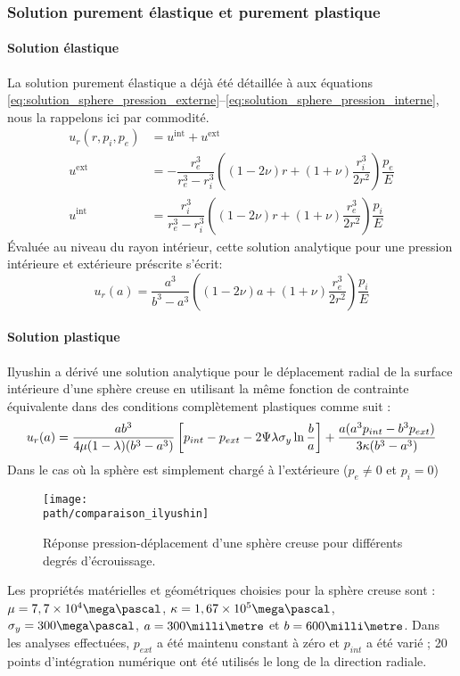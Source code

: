 \documentclass[10pt]{book}
\def\path{./fig}
\begin{document}
\subsubsection{Solution purement élastique et purement plastique}
\paragraph{Solution élastique}
La solution purement élastique a déjà été détaillée à aux équations \eqref{eq:solution_sphere_pression_externe}--\eqref{eq:solution_sphere_pression_interne}, nous la rappelons ici par commodité.
$$\begin{aligned}
u_{r}(r,p_{i}, p_{e})& = u^{\mathrm{int}}+u^{\mathrm{ext}}\\
u^{\mathrm{ext}}&=-\dfrac{r_{e}^{3}}{r_{e}^{3}-r_{i}^{3}}\left((1-2\nu)r+(1+\nu)\dfrac{r_{i}^{3}}{2r^{2}}\right)\dfrac{p_{e}}{E}\\
u^{\mathrm{int}}&=\dfrac{r_{i}^{3}}{r_{e}^{3}-r_{i}^{3}}\left((1-2\nu)r+(1+\nu)\dfrac{r_{e}^{3}}{2r^{2}}\right)\dfrac{p_{i}}{E}
\end{aligned}$$
Évaluée au niveau du rayon intérieur, cette solution analytique pour une pression intérieure et extérieure préscrite s'écrit:
$$u_{r}(a)=\dfrac{a^{3}}{b^{3}-a^{3}}\left((1-2\nu)a+(1+\nu)\dfrac{r_{e}^{3}}{2r^{2}}\right)\dfrac{p_{i}}{E}$$
\paragraph{Solution plastique}
Ilyushin\cite{ilyushin1948plasticity} a dérivé une solution analytique pour le déplacement radial de la surface intérieure d'une sphère creuse en utilisant la même fonction de contrainte équivalente dans des conditions complètement plastiques comme suit :
$$u_{r}(a) = \frac{ab^3}{4\mu(1-\lambda)(b^3-a^3)}\left[p_{int} - p_{ext} - 2\Psi\lambda\sigma_y\ln\frac{b}{a}\right] + \frac{a(a^3p_{int} - b^3p_{ext})}{3\kappa(b^3-a^3)}$$
Dans le cas où la sphère est simplement chargé à l'extérieure ($p_{e}\neq 0$ et $p_{i}=0$)
\begin{figure}[h!]
\centering \texttt{[image: \\path/comparaison\_ilyushin]}
\caption{Réponse pression-déplacement d'une sphère creuse pour différents degrés d'écrouissage.}
\label{fig:comparaison_ilyushin}
\end{figure}
Les propriétés matérielles et géométriques choisies pour la sphère creuse sont : $\ModCis = 7,7 \times 10^4\mega\pascal$, $\BulkModulus = 1,67 \times 10^5\mega\pascal$, $\sigma_y = 300\mega\pascal$, $a = 300\milli\metre$ et $b = 600\milli\metre$. Dans les analyses effectuées, $p_{ext}$ a été maintenu constant à zéro et $p_{int}$ a été varié ; 20 points d'intégration numérique ont été utilisés le long de la direction radiale.
\end{document}
